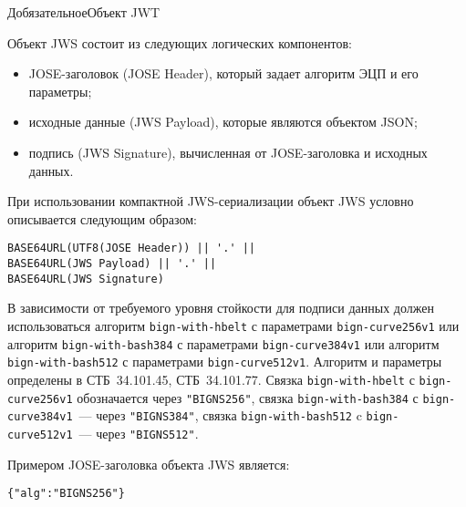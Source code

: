 \begin{appendix}{Д}{обязательное}{Объект JWT}
\label{JWT.JWS}
% 

Объект JWS состоит из следующих логических компонентов:
\begin{itemize}
\item
JOSE-заголовок (JOSE Header), который задает алгоритм ЭЦП и его параметры;
\item
исходные данные (JWS Payload), которые являются объектом JSON;
\item
подпись (JWS Signature), вычисленная от JOSE-заголовка и исходных данных.
\end{itemize}

При использовании компактной JWS-сериализации 
объект JWS условно описывается следующим образом:
\begin{lstlisting}
BASE64URL(UTF8(JOSE Header)) || '.' ||
BASE64URL(JWS Payload) || '.' ||
BASE64URL(JWS Signature)
\end{lstlisting}

В зависимости от требуемого уровня стойкости для подписи данных должен использоваться 
алгоритм \lstinline{bign-with-hbelt} с параметрами \lstinline{bign-curve256v1}
или алгоритм \lstinline{bign-with-bash384} с параметрами \lstinline{bign-curve384v1} 
или алгоритм \lstinline{bign-with-bash512} с параметрами \lstinline{bign-curve512v1}. 
Алгоритм и параметры определены в СТБ~34.101.45, СТБ~34.101.77.
%
Связка \lstinline{bign-with-hbelt} с \lstinline{bign-curve256v1} обозначается 
через \lstinline{"BIGNS256"},  
связка \lstinline{bign-with-bash384} с \lstinline{bign-curve384v1}~--- 
через \lstinline{"BIGNS384"},
связка \lstinline{bign-with-bash512} c \lstinline{bign-curve512v1}~--- 
через \lstinline{"BIGNS512"}.

Примером JOSE-заголовка объекта JWS является:
\begin{lstlisting}
{"alg":"BIGNS256"}
\end{lstlisting}



\end{appendix}
